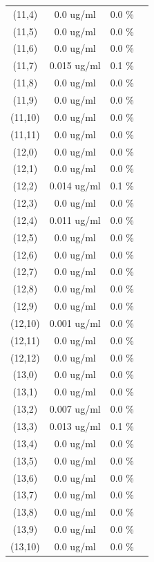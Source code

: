 \documentclass{article}
\begin{document}
\begin{tabular}{c c c c}
(11,4)&        0.0 ug/ml        &0.0 \%\\
(11,5)&        0.0 ug/ml        &0.0 \%\\
(11,6)&        0.0 ug/ml        &0.0 \%\\
(11,7)&        0.015 ug/ml        &0.1 \%\\
(11,8)&        0.0 ug/ml        &0.0 \%\\
(11,9)&        0.0 ug/ml        &0.0 \%\\
(11,10)&        0.0 ug/ml        &0.0 \%\\
(11,11)&        0.0 ug/ml        &0.0 \%\\
(12,0)&        0.0 ug/ml        &0.0 \%\\
(12,1)&        0.0 ug/ml        &0.0 \%\\
(12,2)&        0.014 ug/ml        &0.1 \%\\
(12,3)&        0.0 ug/ml        &0.0 \%\\
(12,4)&        0.011 ug/ml        &0.0 \%\\
(12,5)&        0.0 ug/ml        &0.0 \%\\
(12,6)&        0.0 ug/ml        &0.0 \%\\
(12,7)&        0.0 ug/ml        &0.0 \%\\
(12,8)&        0.0 ug/ml        &0.0 \%\\
(12,9)&        0.0 ug/ml        &0.0 \%\\
(12,10)&        0.001 ug/ml        &0.0 \%\\
(12,11)&        0.0 ug/ml        &0.0 \%\\
(12,12)&        0.0 ug/ml        &0.0 \%\\
(13,0)&        0.0 ug/ml        &0.0 \%\\
(13,1)&        0.0 ug/ml        &0.0 \%\\
(13,2)&        0.007 ug/ml        &0.0 \%\\
(13,3)&        0.013 ug/ml        &0.1 \%\\
(13,4)&        0.0 ug/ml        &0.0 \%\\
(13,5)&        0.0 ug/ml        &0.0 \%\\
(13,6)&        0.0 ug/ml        &0.0 \%\\
(13,7)&        0.0 ug/ml        &0.0 \%\\
(13,8)&        0.0 ug/ml        &0.0 \%\\
(13,9)&        0.0 ug/ml        &0.0 \%\\
(13,10)&        0.0 ug/ml        &0.0 \%\\

\end{tabular}
\end{document}
